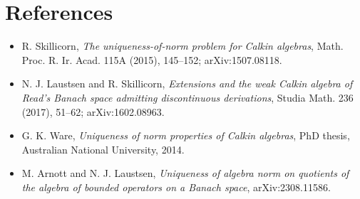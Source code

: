 \documentclass[11pt]{article}
\begin{document}
\section*{References}

\begin{itemize}
\item R. Skillicorn, \emph{The uniqueness-of-norm problem for Calkin
algebras}, Math. Proc. R. Ir. Acad. 115A (2015), 145--152;
arXiv:1507.08118.
\item N. J. Laustsen and R. Skillicorn, \emph{Extensions and the weak Calkin
algebra of Read's Banach space admitting discontinuous derivations}, Studia
Math. 236 (2017), 51--62; arXiv:1602.08963.
\item G. K. Ware, \emph{Uniqueness of norm properties of Calkin algebras},
PhD thesis, Australian National University, 2014.
\item M. Arnott and N. J. Laustsen, \emph{Uniqueness of algebra norm on
quotients of the algebra of bounded operators on a Banach space},
arXiv:2308.11586.
\end{itemize}
\end{document}
